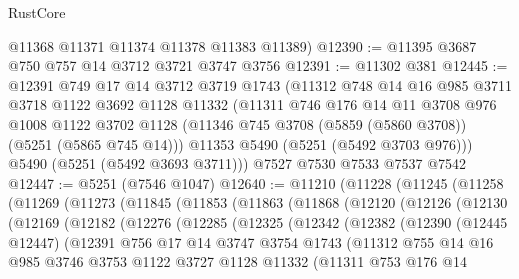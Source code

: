 \begin{lexlean}{RustCore}
\begin{coremodule}
      @11368
      @11371
      @11374
      @11378
      @11383
      @11389)
@12390 := @11395 @3687 @750 @757 @14 @3712 @3721 @3747 @3756
@12391 := @11302 @381
@12445 := @12391
    @749
    @17
    @14
    @3712
    @3719
    @1743
    (@11312
      @748
      @14
      @16
      @985
      @3711
      @3718
      @1122
      @3692
      @1128
      @11332
      (@11311
        @746
        @176
        @14
        @11
        @3708
        @976
        @1008
        @1122
        @3702
        @1128
        (@11346 @745 @3708 (@5859 (@5860 @3708)) (@5251 (@5865 @745 @14)))
        @11353
        @5490
        (@5251 (@5492 @3703 @976)))
      @5490
      (@5251 (@5492 @3693 @3711)))
    @7527
    @7530
    @7533
    @7537
    @7542
@12447 := @5251 (@7546 @1047)
@12640 := @11210
    (@11228
      (@11245
        (@11258
          (@11269
            (@11273
              (@11845
                (@11853
                  (@11863
                    (@11868
                      (@12120
                        (@12126
                          (@12130
                            (@12169
                              (@12182
                                (@12276
                                  (@12285
                                    (@12325
                                      (@12342
                                        (@12382
                                          (@12390
                                            (@12445 @12447)
                                            (@12391
                                              @756
                                              @17
                                              @14
                                              @3747
                                              @3754
                                              @1743
                                              (@11312
                                                @755
                                                @14
                                                @16
                                                @985
                                                @3746
                                                @3753
                                                @1122
                                                @3727
                                                @1128
                                                @11332
                                                (@11311
                                                  @753
                                                  @176
                                                  @14

\end{coremodule}
\end{lexlean}
